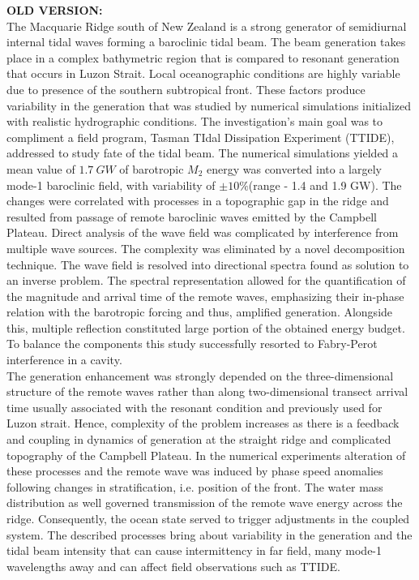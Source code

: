 \documentclass[12pt]{article}
\begin{document}
\textbf{OLD VERSION:}\\
The Macquarie Ridge south of New Zealand is a strong generator of semidiurnal internal tidal waves 
forming a 
baroclinic tidal beam. The beam generation takes place in a complex bathymetric region that is 
compared to resonant generation that occurs in Luzon Strait. Local oceanographic conditions are 
highly variable due to presence of the southern subtropical front. These factors produce 
variability in the generation that was studied by numerical simulations initialized with realistic 
hydrographic conditions. The investigation's main goal was to compliment a field program, Tasman 
TIdal Dissipation Experiment (TTIDE), addressed to study fate of the tidal beam. The 
numerical 
simulations yielded a mean value of $1.7~GW$ of barotropic $M_2$ energy was converted into a 
largely mode-1 baroclinic field, with variability of $\pm 10\%$(range - 1.4 and 1.9 GW). The 
changes were correlated with processes in a topographic gap in the ridge and resulted from passage 
of remote baroclinic waves emitted by the Campbell Plateau. Direct analysis of the wave field was 
complicated by interference from multiple wave sources. The complexity was eliminated by a novel 
decomposition technique. The wave field is resolved into directional spectra found as solution to 
an inverse problem. The spectral representation allowed for the quantification of the magnitude and 
arrival time of the remote waves, emphasizing their in-phase relation with the barotropic forcing 
and thus, amplified generation. Alongside this, multiple reflection constituted large portion of 
the 
obtained energy budget. To balance the components this study successfully resorted to 
Fabry-Perot interference in a cavity.\\

The generation enhancement was strongly depended on the three-dimensional structure of the remote 
waves 
rather than along two-dimensional transect arrival time usually associated with the resonant 
condition and previously used for Luzon strait. Hence, complexity of the problem increases as 
there 
is a feedback and coupling in dynamics of 
generation at the straight ridge and complicated topography of the Campbell 
Plateau. In the numerical 
experiments 
alteration of these processes and the remote wave was induced by phase speed anomalies following 
changes in 
stratification, i.e. position of the front. The water mass distribution as well governed 
transmission of the remote wave energy across the ridge.  Consequently, the ocean state served to 
trigger adjustments in the coupled system. The described processes bring about variability in the 
generation and the tidal beam intensity that can cause 
intermittency in far field, many mode-1 wavelengths away and can affect field observations such as 
TTIDE.
\end{document}
